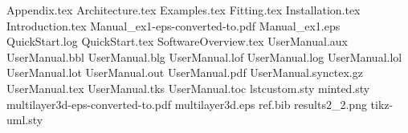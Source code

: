 Appendix.tex
Architecture.tex
Examples.tex
Fitting.tex
Installation.tex
Introduction.tex
Manual_ex1-eps-converted-to.pdf
Manual_ex1.eps
QuickStart.log
QuickStart.tex
SoftwareOverview.tex
UserManual.aux
UserManual.bbl
UserManual.blg
UserManual.lof
UserManual.log
UserManual.lol
UserManual.lot
UserManual.out
UserManual.pdf
UserManual.synctex.gz
UserManual.tex
UserManual.tks
UserManual.toc
lstcustom.sty
minted.sty
multilayer3d-eps-converted-to.pdf
multilayer3d.eps
ref.bib
results2_2.png
tikz-uml.sty
